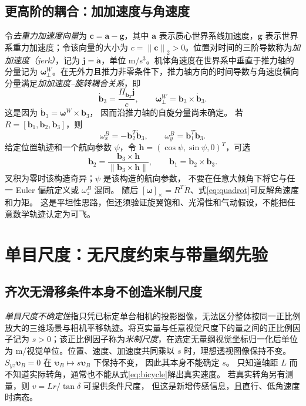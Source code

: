 \documentclass[UTF8,a4paper,fontset=fandol,11pt]{ctexart}
\newcommand{\sk}[1]{[#1]_{\times}}
\newcommand{\norm}[1]{\left\lVert#1\right\rVert}
\newcommand{\vct}[1]{\bm #1}
\begin{document}
\subsection{更高阶的耦合：加加速度与角速度}
令\emph{去重力加速度向量}为 $\vct c=\vct a-\vct g$，其中 $\vct a$ 表示质心世界系线加速度，$\vct g$ 表示世界系重力加速度；令该向量的大小为 $c=\norm{\vct c}_2>0$。位置对时间的三阶导数称为\emph{加加速度（jerk）}，记为 $\vct j=\dot{\vct a}$，单位 m/s$^3$。机体角速度在世界系中垂直于推力轴的分量记为 $\vct\omega_\perp^W$。在无外力且推力非零条件下，推力轴方向的时间导数与角速度横向分量满足\emph{加加速度--旋转耦合关系}，即
\begin{equation}
 \dot{\vct b}_3=\frac{\Pi_{\vct b_3}\vct j}{c},\qquad
 \vct\omega_\perp^W=\vct b_3\times\dot{\vct b}_3.\label{eq:jerk}
\end{equation}
这是因为 $\dot{\vct b}_3=\vct\omega^W\times\vct b_3$，
因而沿推力轴的自旋分量尚未确定。
若 $R=[\vct b_1,\vct b_2,\vct b_3]$，则
\begin{equation}
 \omega_x^B=-\vct b_2^T\dot{\vct b}_3,\qquad
 \omega_y^B=\vct b_1^T\dot{\vct b}_3.
\end{equation}
给定位置轨迹和一个航向参数 $\psi$，令
$\vct h=(\cos\psi,\sin\psi,0)^T$，可选
\begin{equation}
 \vct b_2=\frac{\vct b_3\times\vct h}{\norm{\vct b_3\times\vct h}},\qquad
 \vct b_1=\vct b_2\times\vct b_3.
\end{equation}
叉积为零时该构造奇异；$\psi$ 是该构造的航向参数，
不要在任意大倾角下将它与任一 Euler 偏航定义或 $\omega_z^B$ 混同。
随后 $\sk{\vct\omega}=R^T\dot R$、式\eqref{eq:quadrot}可反解角速度和力矩。
这是平坦性思路，但还须验证旋翼饱和、光滑性和气动假设，不能把任意数学轨迹认定为可飞。

\section{单目尺度：无尺度约束与带量纲先验}
\subsection{齐次无滑移条件本身不创造米制尺度}
\emph{单目尺度不确定性}指只凭已标定单台相机的投影图像，无法区分整体按同一正比例放大的三维场景与相机平移轨迹。将真实量与任意视觉尺度下的量之间的正比例因子记为 $s>0$；该正比例因子称为\emph{米制尺度}，在选定无量纲视觉坐标归一化后单位为 m/视觉单位。位置、速度、加速度共同乘以 $s$ 时，理想透视图像保持不变。
$S_{yz}\vct\upsilon_B=0$ 在 $\vct\upsilon_B\mapsto s\vct\upsilon_B$ 下保持不变，
因此其本身不能确定 $s$。
只知道轴距 $L$ 而不知道实际转角，通常也不能从式\eqref{eq:bicycle}解出真实速度。
若真实转角另有测量，则 $v=Lr/\tan\delta$ 可提供条件尺度，
但这是新增传感信息，且直行、低角速度时病态。
\end{document}

